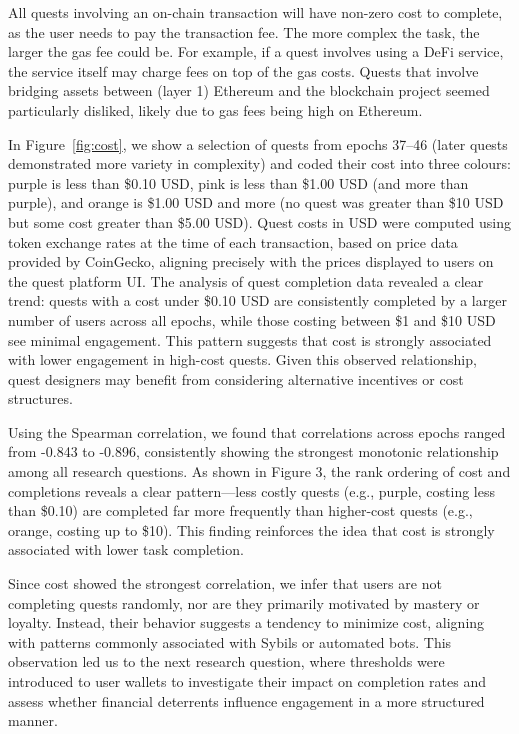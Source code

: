 All quests involving an on-chain transaction will have non-zero cost to complete, as the user needs to pay the transaction fee. The more complex the task, the larger the gas fee could be. For example, if a quest involves using a DeFi service, the service itself may charge fees on top of the gas costs. Quests that involve bridging assets between (layer 1) Ethereum and the blockchain project seemed particularly disliked, likely due to gas fees being high on Ethereum. 

In Figure~\ref{fig:cost}, we show a selection of quests from epochs 37--46 (later quests demonstrated more variety in complexity) and coded their cost into three colours: purple is less than \$0.10 USD, pink is less than \$1.00 USD (and more than purple), and orange is \$1.00 USD and more (no quest was greater than \$10 USD but some cost greater than \$5.00 USD). Quest costs in USD were computed using token exchange rates at the time of each transaction, based on price data provided by CoinGecko, aligning precisely with the prices displayed to users on the quest platform UI. The analysis of quest completion data revealed a clear trend: quests with a cost under \$0.10 USD are consistently completed by a larger number of users across all epochs, while those costing between \$1 and \$10 USD see minimal engagement. This pattern suggests that cost is strongly associated with lower engagement in high-cost quests. Given this observed relationship, quest designers may benefit from considering alternative incentives or cost structures.

Using the Spearman correlation, we found that correlations across epochs ranged from -0.843 to -0.896, consistently showing the strongest monotonic relationship among all research questions.
As shown in Figure 3, the rank ordering of cost and completions reveals a clear pattern—less costly quests (e.g., purple, costing less than \$0.10) are completed far more frequently than higher-cost quests (e.g., orange, costing up to \$10). This finding reinforces the idea that cost is strongly associated with lower task completion.

Since cost showed the strongest correlation, we infer that users are not completing quests randomly, nor are they primarily motivated by mastery or loyalty. Instead, their behavior suggests a tendency to minimize cost, aligning with patterns commonly associated with Sybils or automated bots. This observation led us to the next research question, where thresholds were introduced to user wallets to investigate their impact on completion rates and assess whether financial deterrents influence engagement in a more structured manner. 


